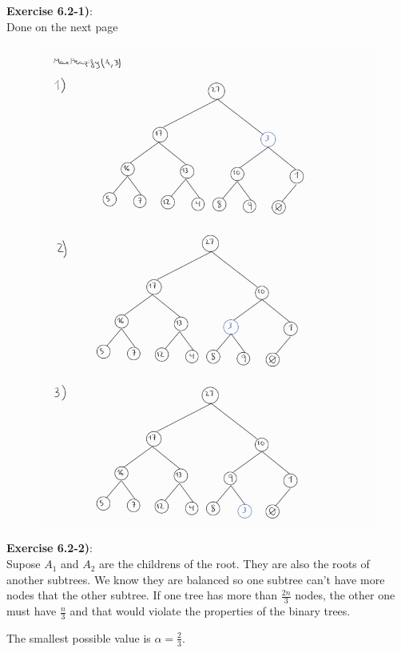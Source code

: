 \documentclass{article}
\newcounter{exercise}[section]   %
\begin{document}
\textbf{Exercise 6.2-1)}:\\
Done on the next page
\begin{figure}[h]
    \centering
    \includegraphics[scale=0.25]{Problem6_2_1.jpeg}
\end{figure}
\newpage

\textbf{Exercise 6.2-2)}:\\
Supose \(A_1\) and \(A_2\) are the childrens of the root. They are also the roots of another 
subtrees. We know they are balanced so one subtree can't have more nodes that the other subtree.
If one tree has more than \(\frac{2n}{3}\) nodes, the other one must have \(\frac{n}{3}\) and
that would violate the properties of the binary trees. 

The smallest possible value is \(\alpha = \frac{2}{3}\). 
\end{document}
